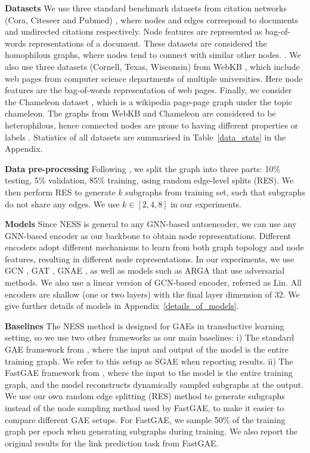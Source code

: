 \documentclass{article}
\begin{document}
\textbf{Datasets} We use three standard benchmark datasets from citation networks (Cora, Citeseer and Pubmed) \citep{sen2008collective}, where nodes and edges correspond to documents and undirected citations respectively. Node features are represented as bag-of-words representations of a document. These datasets are considered the homophilous graphs, where nodes tend to connect with similar other nodes. \citep{mcpherson2001birds}. We also use three datasets (Cornell, Texas, Wisconsin) from WebKB \citep{pei2020geom}, which include web pages from computer science departments of multiple universities. Here node features are the bag-of-words representation of web pages. Finally, we consider the Chameleon dataset \citep{rozemberczki2021multi}, which is a wikipedia page-page graph under the topic chameleon. The graphs from WebKB and Chameleon are considered to be heterophilous, hence connected nodes are prone to having different properties or labels \citep{zhu2020beyond, wang2022augmentation}. Statistics of all datasets are summarised in Table~\ref{data_stats} in the Appendix.

\textbf{Data pre-processing} Following \citep{kipf2016variational}, we split the graph into three parts: 10\% testing, 5\% validation, 85\% training, using random edge-level splits (RES). We then perform RES to generate $k$ subgraphs from training set, such that subgraphs do not share any edges. We use $k \in [2, 4, 8]$ in our experiments.

\textbf{Models} Since NESS is general to any GNN-based autoencoder, we can use any GNN-based encoder as our backbone to obtain node representations. Different encoders adopt different mechanisms to learn from both graph topology and node features, resulting in different node representations. In our experiments, we use GCN \citep{kipf2016variational}, GAT \citep{velivckovic2017graph}, GNAE \citep{ahn2021variational}, as well as models such as ARGA \citep{pan2019learning} that use adversarial methods. We also use a linear version of GCN-based encoder, referred as Lin. All encoders are shallow (one or two layers) with the final layer dimension of 32. We give further details of models in Appendix~\ref{details_of_models}.




\textbf{Baselines} The NESS method is designed for GAEs in transductive learning setting, so we use two other frameworks as our main baselines: i) The standard GAE framework from \citep{kipf2016variational}, where the input and output of the model is the entire training graph. We refer to this setup as SGAE when reporting results. ii) The FastGAE framework from \citep{salha2021fastgae}, where the input to the model is the entire training graph, and the model reconstructs dynamically sampled subgraphs at the output. We use our own random edge splitting (RES) method to generate subgraphs instead of the node sampling method used by FastGAE, to make it easier to compare different GAE setups. For FastGAE, we sample 50\% of the training graph per epoch when generating subgraphs during training. We also report the original results for the link prediction task from FastGAE.
\end{document}
